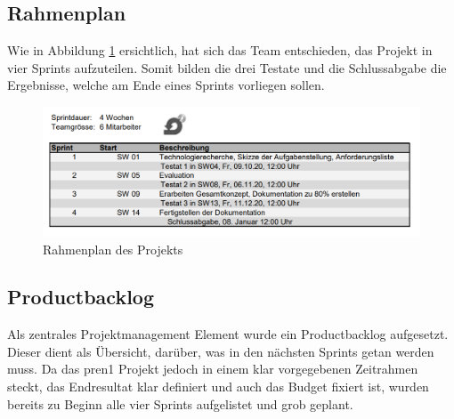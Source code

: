 \subsection{Rahmenplan}
Wie in Abbildung \ref{fig:rahmenplan} ersichtlich, hat sich das Team entschieden, das Projekt in vier Sprints aufzuteilen. Somit bilden die drei Testate und die Schlussabgabe die Ergebnisse, welche am Ende eines Sprints vorliegen sollen.

\begin{figure}[H]
  \includegraphics[width=1.0\textwidth]{img/projektmanagement/Rahmenplan.PNG}
  \centering
  \caption{Rahmenplan des Projekts}
  \label{fig:rahmenplan}
\end{figure}

\newpage

\subsection{Productbacklog}
Als zentrales Projektmanagement Element wurde ein Productbacklog aufgesetzt. Dieser dient als Übersicht, darüber, was in den nächsten Sprints getan werden muss. Da das \acrshort{pren1} Projekt jedoch in einem klar vorgegebenen Zeitrahmen steckt, das Endresultat klar definiert und auch das Budget fixiert ist, wurden bereits zu Beginn alle vier Sprints aufgelistet und grob geplant. 

